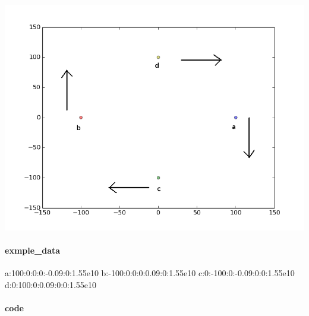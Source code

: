 \documentclass[15pt]{report}
\begin{document}
\centerline{\includegraphics[scale=0.5]{ex1_0}}

\paragraph{exmple\_data}


\begin{code}
a:100:0:0:0:-0.09:0:1.55e10
b:-100:0:0:0:0.09:0:1.55e10
c:0:-100:0:-0.09:0:0:1.55e10
d:0:100:0:0.09:0:0:1.55e10
\end{code}

\paragraph{code}
\end{document}
